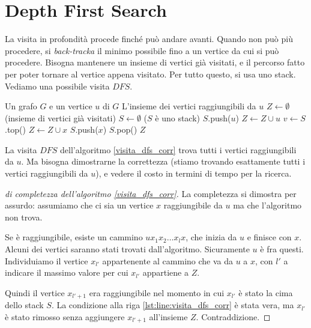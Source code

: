 \section{Depth First Search}
\label{sezione_visita_dfs}

La visita in profondit\`a procede finch\'e pu\`o andare avanti. Quando non pu\`o pi\`u procedere, si \emph{back-tracka} il minimo possibile fino a un vertice da cui si pu\`o procedere. Bisogna mantenere un insieme di vertici gi\`a visitati, e il percorso fatto per poter tornare al vertice appena visitato. Per tutto questo, si usa uno stack. Vediamo una possibile visita $DFS$.

\begin{algorithm}
\caption{\label{visita_dfs_corr}Visita $DFS$}
\begin{algorithmic}[1]
\Require Un grafo $G$ e un vertice $u$ di $G$
\Ensure L'insieme dei vertici raggiungibili da $u$
\State $Z \gets \emptyset$ (insieme di vertici gi\`a visitati)
\State $S \gets \emptyset$ ($S$ \`e uno stack)
\State $S$.push($u$)
\State $Z \gets Z \cup u$
    \State $v \gets S$.top()
     \label{lst:line:visita_dfs_corr}
        \State $Z \gets Z \cup x$
        \State $S$.push($x$)
    \Else
        \State $S$.pop()
    \EndIf
\EndWhile
\State \Return $Z$
\end{algorithmic}
\end{algorithm}

La visita $DFS$ dell'algoritmo \ref{visita_dfs_corr} trova tutti i vertici raggiungibili da $u$. Ma bisogna dimostrarne la correttezza (stiamo trovando esattamente tutti i vertici raggiungibili da $u$), e vedere il costo in termini di tempo per la ricerca. 

\begin{proof}[di completezza dell'algoritmo \ref{visita_dfs_corr}]
La completezza si dimostra per assurdo: assumiamo che ci sia un vertice $x$ raggiungibile da $u$ ma che l'algoritmo non trova.

Se \`e raggiungibile, esiste un cammino $u x_1 x_2 \dots x_l x$, che inizia da $u$ e finisce con $x$. Alcuni dei vertici saranno stati trovati dall'algoritmo. Sicuramente $u$ \`e fra questi. Individuiamo il vertice $x_{l'}$ appartenente al cammino che va da $u$ a $x$, con $l'$ a indicare il massimo valore per cui $x_{l'}$ appartiene a $Z$.

Quindi il vertice $x_{l' + 1}$ era raggiungibile nel momento in cui $x_{l'}$ \`e stato la cima dello stack $S$. La condizione alla riga \ref{lst:line:visita_dfs_corr} \`e stata vera, ma $x_{l'}$ \`e stato rimosso senza aggiungere $x_{l' + 1}$ all'insieme $Z$. Contraddizione.
\end{proof}

